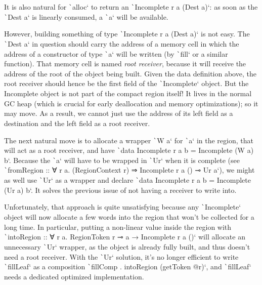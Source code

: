 \documentclass[english]{jflart}
\begin{document}
It is also natural for \texttt`alloc` to return an \texttt`Incomplete r a (Dest a)`: as soon as the \texttt`Dest a` is linearly consumed, a \texttt`a` will be available.

However, building something of type \texttt`Incomplete r a (Dest a)` is not easy. The \texttt`Dest a` in question should carry the address of a memory cell in which the address of a constructor of type \texttt`a` will be written (by \texttt`fill` or a similar function). That memory cell is named \emph{root receiver}, because it will receive the address of the root of the object being built. Given the data definition above, the root receiver should hence be the first field of the \texttt`Incomplete` object. But the Incomplete object is not part of the compact region itself! It lives in the normal GC heap (which is crucial for early deallocation and memory optimizations); so it may move. As a result, we cannot just use the address of its left field as a destination and the left field as a root receiver.

The next natural move is to allocate a wrapper \texttt`W a` for \texttt`a` in the region, that will act as a root receiver, and have \texttt`data Incomplete r a b = Incomplete (W a) b`. Because the \texttt`a` will have to be wrapped in \texttt`Ur` when it is complete (see \texttt`fromRegion :: ∀ r a. (RegionContext r) ⇒ Incomplete r a () ⊸ Ur a`), we might as well use \texttt`Ur` as a wrapper and declare \texttt`data Incomplete r a b = Incomplete (Ur a) b`. It solves the previous issue of not having a receiver to write into.

Unfortunately, that approach is quite unsatisfying because any \texttt`Incomplete` object will now allocate a few words into the region that won't be collected for a long time. In particular, putting a non-linear value inside the region with \texttt`intoRegion :: ∀ r a. RegionToken r ⊸ a → Incomplete r a ()` will allocate an unnecessary \texttt`Ur` wrapper, as the object is already fully built, and thus doesn't need a root receiver. With the \texttt`Ur` solution, it's no longer efficient to write \texttt`fillLeaf` as a composition \texttt`fillComp . intoRegion (getToken @r)`, and \texttt`fillLeaf` needs a dedicated optimized implementation.
\end{document}
